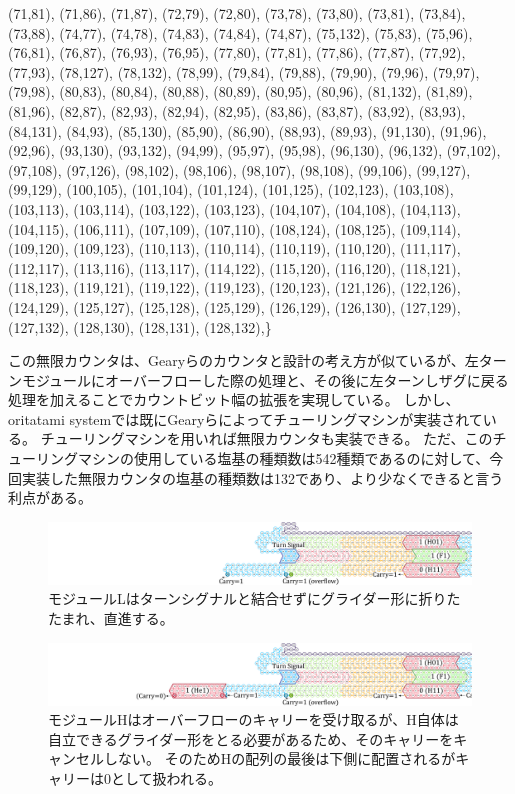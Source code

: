 \documentclass[a4j,11pt]{article}
\begin{document}
(71,81),
(71,86),
(71,87),
(72,79),
(72,80),
(73,78),
(73,80),
(73,81),
(73,84),
(73,88),
(74,77),
(74,78),
(74,83),
(74,84),
(74,87),
(75,132),
(75,83),
(75,96),
(76,81),
(76,87),
(76,93),
(76,95),
(77,80),
(77,81),
(77,86),
(77,87),
(77,92),
(77,93),
(78,127),
(78,132),
(78,99),
(79,84),
(79,88),
(79,90),
(79,96),
(79,97),
(79,98),
(80,83),
(80,84),
(80,88),
(80,89),
(80,95),
(80,96),
(81,132),
(81,89),
(81,96),
(82,87),
(82,93),
(82,94),
(82,95),
(83,86),
(83,87),
(83,92),
(83,93),
(84,131),
(84,93),
(85,130),
(85,90),
(86,90),
(88,93),
(89,93),
(91,130),
(91,96),
(92,96),
(93,130),
(93,132),
(94,99),
(95,97),
(95,98),
(96,130),
(96,132),
(97,102),
(97,108),
(97,126),
(98,102),
(98,106),
(98,107),
(98,108),
(99,106),
(99,127),
(99,129),
(100,105),
(101,104),
(101,124),
(101,125),
(102,123),
(103,108),
(103,113),
(103,114),
(103,122),
(103,123),
(104,107),
(104,108),
(104,113),
(104,115),
(106,111),
(107,109),
(107,110),
(108,124),
(108,125),
(109,114),
(109,120),
(109,123),
(110,113),
(110,114),
(110,119),
(110,120),
(111,117),
(112,117),
(113,116),
(113,117),
(114,122),
(115,120),
(116,120),
(118,121),
(118,123),
(119,121),
(119,122),
(119,123),
(120,123),
(121,126),
(122,126),
(124,129),
(125,127),
(125,128),
(125,129),
(126,129),
(126,130),
(127,129),
(127,132),
(128,130),
(128,131),
(128,132),\}

この無限カウンタは、Gearyらのカウンタと設計の考え方が似ているが、左ターンモジュールにオーバーフローした際の処理と、その後に左ターンしザグに戻る処理を加えることでカウントビット幅の拡張を実現している。
しかし、oritatami systemでは既にGearyらによってチューリングマシンが実装されている\cite{GeMeScSe2018}。
チューリングマシンを用いれば無限カウンタも実装できる。
ただ、このチューリングマシンの使用している塩基の種類数は542種類であるのに対して、今回実装した無限カウンタの塩基の種類数は132であり、より少なくできると言う利点がある。

%
%
%
\begin{figure}[p]
\centering
\includegraphics[width=\linewidth]{fig/svg/CounterEx14_1.pdf}
\caption{
モジュールLはターンシグナルと結合せずにグライダー形に折りたたまれ、直進する。
}
\label{fig:overflowex2}
\end{figure}

\begin{figure}[h]
\centering
\includegraphics[width=\linewidth]{fig/svg/CounterEx15_1.pdf}
\caption{
モジュールHはオーバーフローのキャリーを受け取るが、H自体は自立できるグライダー形をとる必要があるため、そのキャリーをキャンセルしない。
そのためHの配列の最後は下側に配置されるがキャリーは0として扱われる。
}
\label{fig:overflowex3}
\end{figure}
\end{document}

